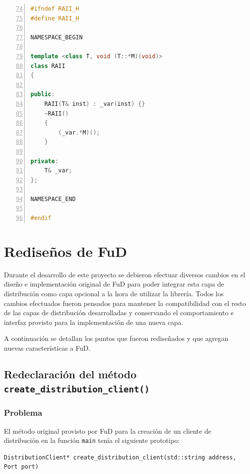 \begin{lstlisting}[frame=shadowbox, language=C++, numbers=left, xleftmargin=8mm, framexleftmargin=22pt, basicstyle=\scriptsize, numberstyle=\footnotesize, breaklines=true, breakatwhitespace=false, captionpos=b, caption={Implementación RAII de la librería mili}, label=listing:mili:raii, backgroundcolor=\color{gris}, firstnumber=74, keywordstyle=\color{Blue}]
#ifndef RAII_H
#define RAII_H

NAMESPACE_BEGIN

template <class T, void (T::*M)(void)>
class RAII
{

public:
    RAII(T& inst) : _var(inst) {}
    ~RAII()
    {
        (_var.*M)();
    }

private:
    T& _var;
};

NAMESPACE_END

#endif
\end{lstlisting}


\section{Rediseños de FuD}
\label{seccion:rediseno:fud}

Durante el desarrollo de este proyecto se debieron efectuar diversos cambios en el diseño e implementación original de FuD para poder integrar esta capa de distribución como capa opcional a la hora de utilizar la librería. Todos los cambios efectuados fueron pensados para mantener la compatibilidad con el resto de las capas de distribución desarrolladas y conservando el comportamiento e interfaz provisto para la implementación de una nueva capa.

A continuación se detallan los puntos que fueron rediseñados y que agregan nuevas características a FuD.

\subsection{Redeclaración del método \texttt{create\_distribution\_client()}}
\label{rediseno:create:distr:client}

\subsubsection{Problema}
El método original provisto por FuD para la creación de un cliente de distribución en la función \texttt{main} tenía el siguiente prototipo:

\texttt{DistributionClient* create\_distribution\_client(std::string address, Port port)}\\

